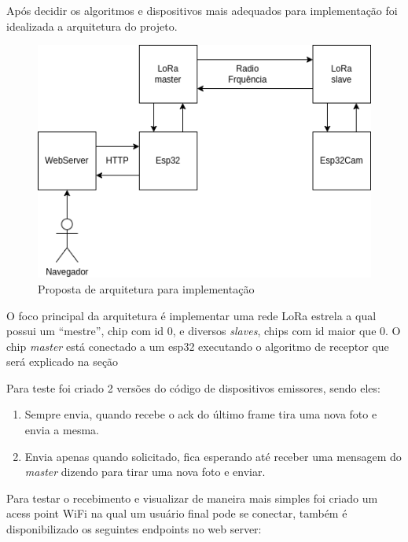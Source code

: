 \documentclass[
article,			%
12pt,				%
oneside,			%
a4paper,			%
english,			%
brazil,				%
sumario=tradicional
]{abntex2}
\begin{document}
Após decidir os algoritmos e dispositivos mais adequados para implementação foi idealizada a arquitetura do projeto.

\cleardoublepage
\begin{figure}[!htb]
    \centering
    \includegraphics[width=.9\textwidth]{arch}
    \caption{\label{fig:arch}Proposta de arquitetura para implementação}
\end{figure}

O foco principal da arquitetura é implementar uma rede LoRa estrela a qual possui um ``mestre'', chip com id 0, e diversos \textit{slaves}, chips com id maior que 0. O chip \textit{master} está conectado a um esp32 executando o algoritmo de receptor que será explicado na seção 

Para teste foi criado 2 versões do código de dispositivos emissores, sendo eles:
\begin{enumerate}
    \item Sempre envia, quando recebe o ack do último frame tira uma nova foto e envia a mesma.
    \item Envia apenas quando solicitado, fica esperando até receber uma mensagem do \textit{master} dizendo para tirar uma nova foto e enviar.
\end{enumerate}

Para testar o recebimento e visualizar de maneira mais simples foi criado um acess point WiFi na qual um usuário final pode se conectar, também é disponibilizado os seguintes endpoints no web server:
\end{document}
